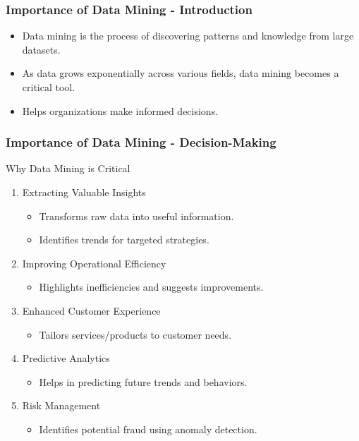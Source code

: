 \documentclass[aspectratio=169]{beamer}
\begin{document}
\begin{frame}[fragile]
    \frametitle{Importance of Data Mining - Introduction}
    \begin{itemize}
        \item Data mining is the process of discovering patterns and knowledge from large datasets.
        \item As data grows exponentially across various fields, data mining becomes a critical tool.
        \item Helps organizations make informed decisions.
    \end{itemize}
\end{frame}

\begin{frame}[fragile]
    \frametitle{Importance of Data Mining - Decision-Making}
    \begin{block}{Why Data Mining is Critical}
        \begin{enumerate}
            \item Extracting Valuable Insights
                \begin{itemize}
                    \item Transforms raw data into useful information.
                    \item Identifies trends for targeted strategies.
                \end{itemize}
            \item Improving Operational Efficiency
                \begin{itemize}
                    \item Highlights inefficiencies and suggests improvements.
                \end{itemize}
            \item Enhanced Customer Experience
                \begin{itemize}
                    \item Tailors services/products to customer needs.
                \end{itemize}
            \item Predictive Analytics
                \begin{itemize}
                    \item Helps in predicting future trends and behaviors.
                \end{itemize}
            \item Risk Management
                \begin{itemize}
                    \item Identifies potential fraud using anomaly detection.
                \end{itemize}
        \end{enumerate}
    \end{block}
\end{frame}
\end{document}
